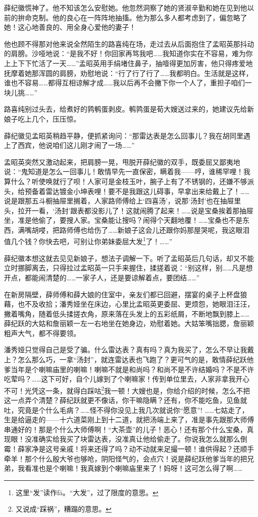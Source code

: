 \par 薛纪徽慌神了。他不知该怎么安慰她。他忽然洞察了她的贤淑辛勤和她在见到他以前的拚命克制。他的良心在一阵阵地抽搐。他为那么多人都考虑到了，偏忽略了她！这心地善良的、用全身心爱他的妻子！
\par 他也顾不得那对他来说全然陌生的路喜纯在场，走过去从后面抱住了孟昭英那抖动的肩膀。沙哑地说：“是我不好！你回家再骂我吧……我知道你实在不容易，难为你上上下下忙活了一天……”孟昭英用手绢堵住鼻子，抽噎得更加厉害，他只得疼爱地抚摩着她那浑圆的肩膀，劝慰地说：“行了行了行了……我都明白。生活就是这样，谁也不容易……都得互相谅解才成……我以后再不会撇下你一个人了，重担子咱们一块儿挑……”
\par 路喜纯别过头去，给煮好的鹑鹌蛋剥皮。鹌鹑蛋是荀大嫂送过来的，她建议先给新娘子吃上几个，压压惊。
\par 薛纪徽见孟昭英稍趋平静，便抓紧询问：“那雷达表是怎么回事儿？我在胡同里遇上了西宾，他说咱们这儿刚才闹了一场……”
\par 孟昭英突然又激动起来，把肩膀一晃，甩脱开薛纪徽的双手，既委屈又鄙夷地说：“鬼知道是怎么一回事儿！敢情早先一直保密，瞒着我——哼，谁稀罕哩！我算什么？听使唤就行了呗！人家可是金枝玉叶，腕子上有了不锈钢的，还嫌不够派头，给预备着雷达镀金小坤表哩！要不是我跟这儿碍事，早拿出来给戴上了！……说是跟那五斗橱抽屉里搁着，人家路师傅给上‘四喜汤’，说那‘汤封’也在抽屉里头，拉开一看，‘汤封’跟表都没影儿了！这就闹腾了起来！……说是宝桑挨着那抽屉坐，准是他偷了，要搜人家。宝桑能让搜吗？闹得个天翻地覆！……宝桑也不是东西，满嘴胡唚，把路师傅也给伤了……新娘子这会儿还跟你妈那屋哭呢，我这眼泪值几个钱？你快去吧，可别让你弟妹委屈大发\footnote{这里“发”读作fā。“大发”，过了限度的意思。}了！……”
\par 薛纪徽本想这就去见见新娘子，想法子调解一下。听了孟昭英后几句话，却又不能立时挪脚离去，只得拉过孟昭英一只手来握住，揉搓着说：“别这样，别……凡是想开点，都能闹清楚的……一家子人，还是要谅解着点，要团结……”
\par 在新房隔壁，薛师傅和薛大娘的住室中，亲友们都已回避，摆宴的桌子上杯盘狼藉，也不及收拾；潘秀娅坐在床边，心里比孟昭英更委屈、更烦怨，她眼泪汪汪，撇着嘴角，随着低头揉搓衣角，原来落在头发上的五彩纸屑，不断地飘到膝上……薛纪跃的大姑和詹丽颖一左一右地坐在她身边，劝慰着她。大姑笨嘴拙腮，詹丽颖粗声大气，都不得要领。
\par 潘秀娅只觉得自己是受了骗。什么雷达表？真有吗？真为我买了，怎么不早让我戴上？怎么那么巧，一拿“汤封”，就连雷达表也飞跑了？更可气的是，敢情薛纪跃他爹当年是个喇嘛庙里的喇嘛！喇嘛不就是和尚吗？和尚不是不许结婚吗？不是不许吃荤吗？……这下可好，自个儿嫁到了个喇嘛家！传到单位里去，人家非拿我开心不可！光凭这一条，就得白踩咕\footnote{又说成“踩祸”，糟蹋的意思。}我一顿！大嫂也是，你给介绍的时候，怎么不把这一点弄个清楚？薛纪跃就更不像话，你干嘛隐瞒？还有，你不能吃鱼，见鱼就吐，究竟是个什么毛病？……怪不得你没见上我几次就说你“愿意”! ……七姑走了，生是给逼走的——十六道菜刚上到十二道，就把汤端上来了，准是事先跟那大师傅串通好的！那是个什么大师傅啊！“大茶壶”的儿子！恶心！还有那个什么宝桑，真现眼！没准确实给我买了块雷达表，没准真让他给偷走了。你说我怎么就那么倒霉！薛家净是这号亲戚！将来还得了吗？动不动就来足撮一顿！谁供得起？还顺手牵羊！那个什么殷大爷也够呛，阴阳怪气的，会点穴！说是薛纪跃他爹当年的把兄弟，我看准也是个喇嘛！我真嫁到个喇嘛庙里来了！妈呀！这可怎么得了啊……
